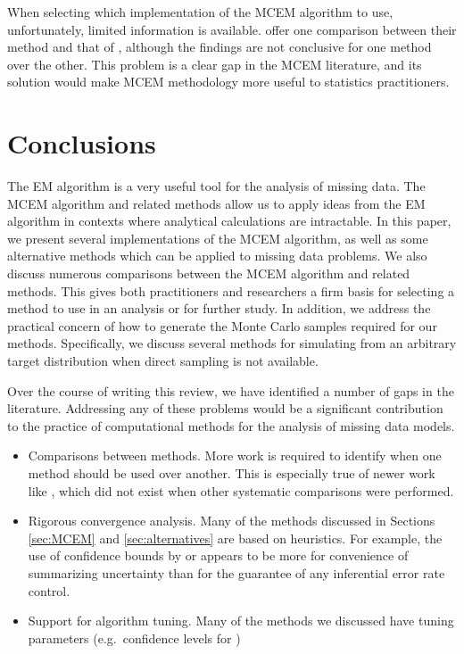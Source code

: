 \documentclass[11pt, oneside]{article}   	%
\begin{document}
When selecting which implementation of the MCEM algorithm to use, unfortunately, limited information is available. \citet{Caf05} offer one comparison between their method and that of \citet{Boo99}, although the findings are not conclusive for one method over the other. This problem is a clear gap in the MCEM literature, and its solution would make MCEM methodology more useful to statistics practitioners.

\section{Conclusions}
\label{sec:conc}

The EM algorithm is a very useful tool for the analysis of missing data. The MCEM algorithm and related methods allow us to apply ideas from the EM algorithm in contexts where analytical calculations are intractable. In this paper, we present several implementations of the MCEM algorithm, as well as some alternative methods which can be applied to missing data problems. We also discuss numerous comparisons between the MCEM algorithm and related methods. This gives both practitioners and researchers a firm basis for selecting a method to use in an analysis or for further study. In addition, we address the practical concern of how to generate the Monte Carlo samples required for our methods. Specifically, we discuss several methods for simulating from an arbitrary target distribution when direct sampling is not available. 

Over the course of writing this review, we have identified a number of gaps in the literature. Addressing any of these problems would be a significant contribution to the practice of computational methods for the analysis of missing data models.

\begin{itemize}
    \item Comparisons between methods. More work is required to identify when one method should be used over another. This is especially true of newer work like \citet{Caf05}, which did not exist when other systematic comparisons were performed.
    \item Rigorous convergence analysis. Many of the methods discussed in Sections \ref{sec:MCEM} and \ref{sec:alternatives} are based on heuristics. For example, the use of confidence bounds by \citet{Boo99} or \citet{Caf05} appears to be more for convenience of summarizing uncertainty than for the guarantee of any inferential error rate control.
    \item Support for algorithm tuning. Many of the methods we discussed have tuning parameters (e.g.\ confidence levels for \citealp{Caf05})
\end{itemize}
\end{document}
